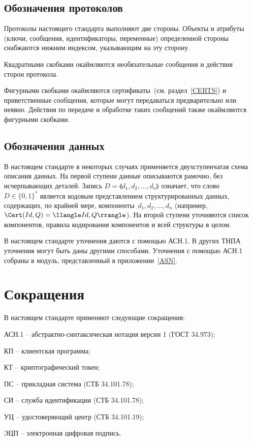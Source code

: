\subsection{Обозначения протоколов}\label{DEFS.Proto}

Протоколы настоящего стандарта выполняют две стороны.
Объекты и атрибуты (ключи, сообщения, идентификаторы, переменные)
определенной стороны снабжаются нижним индексом,
указывающим на эту сторону.

Квадратными скобками окаймляются 
необязательные сообщения и действия сторон протокола.

Фигурными скобками окаймляются сертификаты~(см. раздел~\ref{CERTS})
и приветственные сообщения,
которые могут передаваться предварительно или неявно. 
Действия по передаче и обработке таких сообщений
также окаймляются фигурными скобками.

\subsection{Обозначения данных}\label{DEFS.Data}

В настоящем стандарте в некоторых случаях применяется двухступенчатая 
схема описания данных. На первой ступени данные описываются рамочно, без 
исчерпывающих деталей. Запись $D = \llangle d_1, d_2,\ldots, d_n\rrangle$ 
означает, что слово $D \in\{0,1\}^*$ является кодовым представлением 
структурированных данных, содержащих, по крайней мере, 
компоненты~$d_1,d_2,\ldots,d_n$
(например, $\Cert(Id,Q)=\llangle Id,Q\rrangle$).
%
На второй ступени  уточняются список компонентов, правила кодирования
компонентов и всей структуры в целом.

В настоящем стандарте уточнения даются с помощью АСН.1.
В других ТНПА уточнения могут быть даны другими способами.
Уточнения с помощью АСН.1 собраны в модуль, представленный 
в приложении~\ref{ASN}. 

\section{Сокращения}\label{DEFS.Abbr}

В настоящем стандарте применяют следующие сокращения:

АСН.1 -- абстрактно-синтаксическая нотация версии 1 (ГОСТ 34.973);

КП -- клиентская программа;

КТ -- криптографический токен;

ПС -- прикладная система (СТБ 34.101.78);

СИ -- служба идентификации (СТБ 34.101.78);

УЦ -- удостоверяющий центр (СТБ 34.101.19);

ЭЦП -- электронная цифровая подпись.

